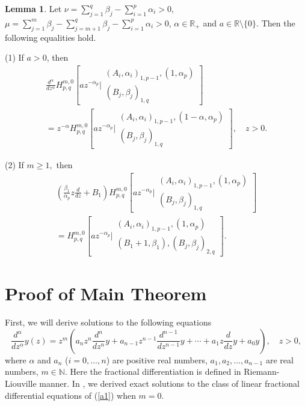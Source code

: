 \documentclass[12pt]{article}
\theoremstyle{definition}
\newtheorem{lemma}{Lemma}
\begin{document}
\begin{lemma}\label{le5}
Let $\nu=\sum_{j=1}^{q}\beta_j-\sum_{i=1}^{p}\alpha_i> 0,$ $\mu=\sum\limits_{j=1}^{m}\beta_j-\sum\limits_{j=m+1}^{q}\beta_j-\sum\limits_{i=1}^{p}\alpha_i>0$, $\alpha\in \mathbb{R}_+$ and $a\in \mathbb{R}\setminus\{0\}$.  Then the following equalities hold.

(1) If $a>0$, then
\begin{multline*}
\frac{d^\alpha}{d z^\alpha}H_{p,q}^{m,0}\left[az^{-\alpha_p}\biggr\vert\begin{array}{c}
(A_i,\alpha_i)_{1,p-1}, (1, \alpha_p)\\
(B_j,\beta_j)_{1,q}
\end{array}\right]\\
=z^{-\alpha}H_{p,q}^{m,0}\left[az^{-\alpha_p}\biggr\vert\begin{array}{c}
(A_i,\alpha_i)_{1,p-1}, (1-\alpha, \alpha_p)\\
(B_j,\beta_j)_{1,q}
\end{array}\right],\quad z>0.
\end{multline*}

(2) If $m\ge 1,$ then
\begin{multline*}
\left(\frac{\beta_1}{\alpha_p}z\frac{d}{dz}+B_1\right)H_{p,q}^{m,0}\left[az^{-\alpha_p}\biggr\vert\begin{array}{c}
(A_i,\alpha_i)_{1,p-1}, (1, \alpha_p)\\
(B_j,\beta_j)_{1,q}
\end{array}\right]\\
=H_{p,q}^{m,0}\left[az^{-\alpha_p}\biggr\vert\begin{array}{c}
(A_i,\alpha_i)_{1,p-1}, (1, \alpha_p)\\
(B_1+1,\beta_1),(B_j,\beta_j)_{2,q}
\end{array}\right].
\end{multline*}
\end{lemma}


\section{Proof of Main Theorem}
First, we will derive solutions to the following equations
\begin{equation}\label{a1}
\frac{d^\alpha}{dz^\alpha}y(z)=
  z^m\left(a_nz^n\frac{d^n}{dz^n}y+a_{n-1}z^{n-1}\frac{d^{n-1}}{dz^{n-1}}y+\cdots+ a_1z\frac{d}{dz}y +a_0y\right), \quad z>0,
\end{equation} 
where $\alpha$ and $a_n$ ($i=0,\ldots,n$) are positive real numbers, $a_1,a_2,\ldots,a_{n-1}$ are real numbers, $m\in\mathbb{N}$. Here the fractional differentiation is defined in Riemann-Liouville manner. In \cite{Khon}, we derived exact solutions to the class of linear fractional differential equations of (\ref{a1}) when $m=0$. 
\end{document}
